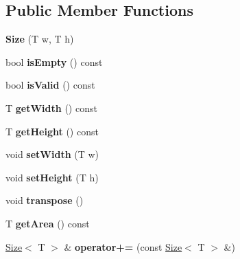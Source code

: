 \subsection*{Public Member Functions}
\begin{DoxyCompactItemize}
\item 
\hypertarget{class_size_af1c5ad71aa40371fa62aa71ee81c3dde}{
{\bfseries Size} (T w, T h)}
\label{class_size_af1c5ad71aa40371fa62aa71ee81c3dde}

\item 
\hypertarget{class_size_a2feb6af7868053ec23b4eea7f2cc64dd}{
bool {\bfseries isEmpty} () const }
\label{class_size_a2feb6af7868053ec23b4eea7f2cc64dd}

\item 
\hypertarget{class_size_a72f90a2c7648b173a81d1535c45e1168}{
bool {\bfseries isValid} () const }
\label{class_size_a72f90a2c7648b173a81d1535c45e1168}

\item 
\hypertarget{class_size_a8f02c9a3825f72db52762c8c6dbac9f9}{
T {\bfseries getWidth} () const }
\label{class_size_a8f02c9a3825f72db52762c8c6dbac9f9}

\item 
\hypertarget{class_size_aaca336454ac27a1359a7f815da660ab4}{
T {\bfseries getHeight} () const }
\label{class_size_aaca336454ac27a1359a7f815da660ab4}

\item 
\hypertarget{class_size_a121262181e42aa1ca35b87eb072230fc}{
void {\bfseries setWidth} (T w)}
\label{class_size_a121262181e42aa1ca35b87eb072230fc}

\item 
\hypertarget{class_size_a31c905c24fc46fd7fb0ead3b27c883bf}{
void {\bfseries setHeight} (T h)}
\label{class_size_a31c905c24fc46fd7fb0ead3b27c883bf}

\item 
\hypertarget{class_size_ad4fe5e5347033c30961bf0bb68e2f2db}{
void {\bfseries transpose} ()}
\label{class_size_ad4fe5e5347033c30961bf0bb68e2f2db}

\item 
\hypertarget{class_size_adb5d429e93a45a4711a34a1b1b5d979f}{
T {\bfseries getArea} () const }
\label{class_size_adb5d429e93a45a4711a34a1b1b5d979f}

\item 
\hypertarget{class_size_a0ce6047fd3c0a883acd287b5b34d083b}{
\hyperlink{class_size}{Size}$<$ T $>$ \& {\bfseries operator+=} (const \hyperlink{class_size}{Size}$<$ T $>$ \&)}
\label{class_size_a0ce6047fd3c0a883acd287b5b34d083b}


\end{DoxyCompactItemize}
